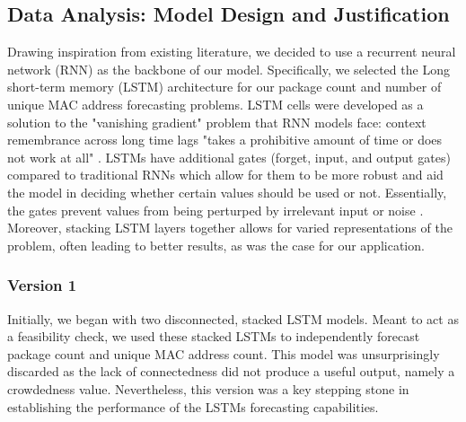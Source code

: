 \documentclass[journal, 12pt]{IEEEtran}
\begin{document}
\subsection{Data Analysis: Model Design and Justification}
\label{section:model_design}

\noindent Drawing inspiration from existing literature, we decided to use a recurrent neural network (RNN) as the backbone of our model. Specifically, we selected the Long short-term memory (LSTM) architecture for our package count and number of unique MAC address forecasting problems. LSTM cells were developed as a solution to the "vanishing gradient" \cite{lstm} problem that RNN models face: context remembrance across long time lags "takes a prohibitive amount of time or does not work at all" \cite{lstm}. LSTMs have additional gates (forget, input, and output gates) compared to traditional RNNs which allow for them to be more robust and aid the model in deciding whether certain values should be used or not. Essentially, the gates prevent values from being perturped by irrelevant input or noise \cite{lstm}. Moreover, stacking LSTM layers together allows for varied representations of the problem, often leading to better results, as was the case for our application. 


\newpage
\subsubsection{Version 1}
Initially, we began with two disconnected, stacked LSTM models. Meant to act as a feasibility check, we used these stacked LSTMs to independently forecast package count and unique MAC address count. This model was unsurprisingly discarded as the lack of connectedness did not produce a useful output, namely a crowdedness value. Nevertheless, this version was a key stepping stone in establishing the performance of the LSTMs forecasting capabilities. 
\end{document}
